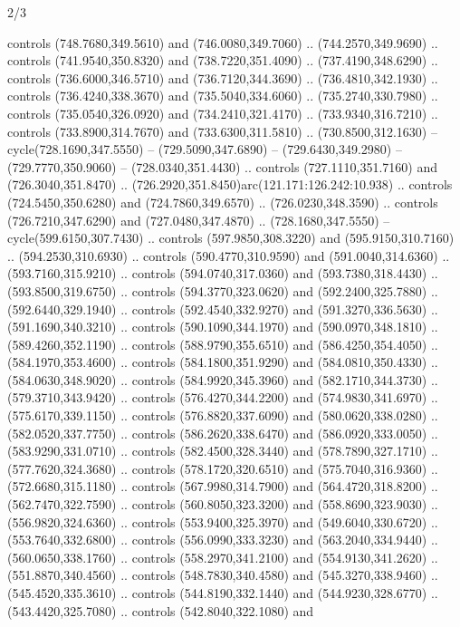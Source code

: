 \begin{flagdescription}{2/3}
\begin{scope}[xshift=\flaglength/2,yshift=\flagwidth/2,scale=\flagwidth/341]
\begin{scope}[xshift=-20mm,yshift=38.3mm,scale=0.1565]
\begin{scope}[y=0.80pt, x=0.80pt, yscale=-1, xscale=1,draw=gold,fill=white]
\begin{scope}[line join=round,line cap=round,line width=1.016\lw]
\begin{scope}[fill]
  controls (748.7680,349.5610) and (746.0080,349.7060) .. (744.2570,349.9690) ..
  controls (741.9540,350.8320) and (738.7220,351.4090) .. (737.4190,348.6290) ..
  controls (736.6000,346.5710) and (736.7120,344.3690) .. (736.4810,342.1930) ..
  controls (736.4240,338.3670) and (735.5040,334.6060) .. (735.2740,330.7980) ..
  controls (735.0540,326.0920) and (734.2410,321.4170) .. (733.9340,316.7210) ..
  controls (733.8900,314.7670) and (733.6300,311.5810) .. (730.8500,312.1630) --
  cycle(728.1690,347.5550) -- (729.5090,347.6890) -- (729.6430,349.2980) --
  (729.7770,350.9060) -- (728.0340,351.4430) .. controls (727.1110,351.7160) and
  (726.3040,351.8470) .. (726.2920,351.8450)arc(121.171:126.242:10.938) ..
  controls (724.5450,350.6280) and (724.7860,349.6570) .. (726.0230,348.3590) ..
  controls (726.7210,347.6290) and (727.0480,347.4870) .. (728.1680,347.5550) --
  cycle(599.6150,307.7430) .. controls (597.9850,308.3220) and
  (595.9150,310.7160) .. (594.2530,310.6930) .. controls (590.4770,310.9590) and
  (591.0040,314.6360) .. (593.7160,315.9210) .. controls (594.0740,317.0360) and
  (593.7380,318.4430) .. (593.8500,319.6750) .. controls (594.3770,323.0620) and
  (592.2400,325.7880) .. (592.6440,329.1940) .. controls (592.4540,332.9270) and
  (591.3270,336.5630) .. (591.1690,340.3210) .. controls (590.1090,344.1970) and
  (590.0970,348.1810) .. (589.4260,352.1190) .. controls (588.9790,355.6510) and
  (586.4250,354.4050) .. (584.1970,353.4600) .. controls (584.1800,351.9290) and
  (584.0810,350.4330) .. (584.0630,348.9020) .. controls (584.9920,345.3960) and
  (582.1710,344.3730) .. (579.3710,343.9420) .. controls (576.4270,344.2200) and
  (574.9830,341.6970) .. (575.6170,339.1150) .. controls (576.8820,337.6090) and
  (580.0620,338.0280) .. (582.0520,337.7750) .. controls (586.2620,338.6470) and
  (586.0920,333.0050) .. (583.9290,331.0710) .. controls (582.4500,328.3440) and
  (578.7890,327.1710) .. (577.7620,324.3680) .. controls (578.1720,320.6510) and
  (575.7040,316.9360) .. (572.6680,315.1180) .. controls (567.9980,314.7900) and
  (564.4720,318.8200) .. (562.7470,322.7590) .. controls (560.8050,323.3200) and
  (558.8690,323.9030) .. (556.9820,324.6360) .. controls (553.9400,325.3970) and
  (549.6040,330.6720) .. (553.7640,332.6800) .. controls (556.0990,333.3230) and
  (563.2040,334.9440) .. (560.0650,338.1760) .. controls (558.2970,341.2100) and
  (554.9130,341.2620) .. (551.8870,340.4560) .. controls (548.7830,340.4580) and
  (545.3270,338.9460) .. (545.4520,335.3610) .. controls (544.8190,332.1440) and
  (544.9230,328.6770) .. (543.4420,325.7080) .. controls (542.8040,322.1080) and

\end{scope}
\end{scope}
\end{scope}
\end{scope}
\end{scope}
\end{flagdescription}
